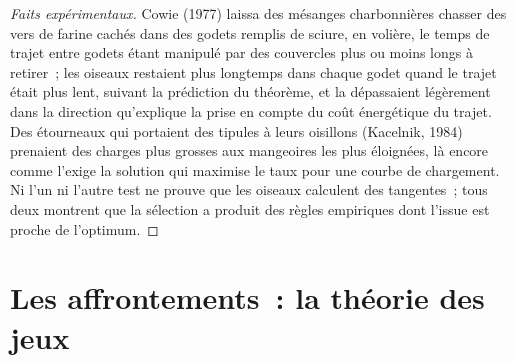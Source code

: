 \begin{proof}[Faits expérimentaux]
Cowie (1977) laissa des mésanges charbonnières chasser des vers de
farine cachés dans des godets remplis de sciure, en volière, le temps de
trajet entre godets étant manipulé par des couvercles plus ou moins
longs à retirer~; les oiseaux restaient plus longtemps dans chaque godet
quand le trajet était plus lent, suivant la prédiction du théorème, et
la dépassaient légèrement dans la direction qu'explique la prise en
compte du coût énergétique du trajet. Des étourneaux qui portaient des
tipules à leurs oisillons (Kacelnik, 1984) prenaient des charges plus
grosses aux mangeoires les plus éloignées, là encore comme l'exige la
solution qui maximise le taux pour une courbe de chargement. Ni l'un ni
l'autre test ne prouve que les oiseaux calculent des tangentes~; tous
deux montrent que la sélection a produit des règles empiriques dont
l'issue est proche de l'optimum.
\end{proof}

\section{Les affrontements~: la théorie des jeux}


